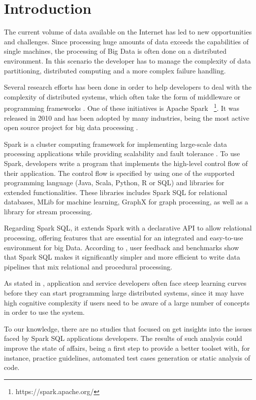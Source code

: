 \chapter{Introduction}

The current volume of data available on the Internet has led to new opportunities and challenges. Since processing huge amounts of data exceeds the capabilities of single machines, the processing of Big Data is often done on a distributed environment. In this scenario the developer has to manage the complexity of data partitioning, distributed computing and a more complex failure handling.

Several research efforts has been done in order to help developers to deal with the complexity of distributed systems, which often take the form of middleware or programming frameworks \cite{ranganathan2007complexity}. One of these initiatives is Apache Spark ~\footnote{https://spark.apache.org/}. It was released in 2010 and has been adopted by many industries, being the most active open source project for big data processing \cite{armbrust2015sparksql}. 

Spark is a cluster computing framework for implementing large-scale data processing applications while providing scalability and fault tolerance \cite{zaharia2010spark}. To use Spark, developers write a program that implements the high-level control flow of their application. The control flow is specified by using one of the supported programming language (Java, Scala, Python, R or SQL) and libraries for extended functionalities. These libraries includes Spark SQL for relational databases, MLib for  machine learning, GraphX for graph processing, as well as a library for stream processing.

Regarding Spark SQL, it extends Spark with a declarative API to allow relational processing, offering features that are essential for an integrated and easy-to-use environment for big Data. According to \cite{armbrust2015sparksql}, user feedback and benchmarks show that Spark SQL makes it significantly simpler and more efficient to write data pipelines that mix relational and procedural processing. 

As stated in \cite{ranganathan2007complexity}, application and service developers often face steep learning curves before they can start programming large distributed systems, since it may have high cognitive complexity if users need to be aware of a large number of concepts in order to use the system. 

To our knowledge, there are no studies that focused on get insights into the issues faced by Spark SQL applications developers. The results of such analysis could improve the state of affairs, being a first step to provide a better toolset with, for instance, practice guidelines, automated test cases generation or static analysis of code.

